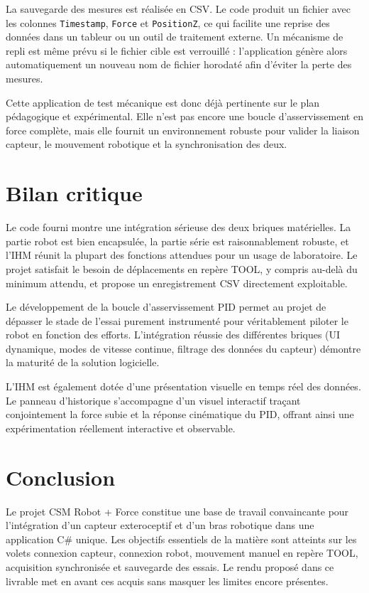 \documentclass[11pt,a4paper]{article}
\begin{document}
La sauvegarde des mesures est r\'ealis\'ee en CSV. Le code produit un fichier avec les colonnes \texttt{Timestamp}, \texttt{Force} et \texttt{PositionZ}, ce qui facilite une reprise des donn\'ees dans un tableur ou un outil de traitement externe. Un m\'ecanisme de repli est m\^eme pr\'evu si le fichier cible est verrouill\'e : l'application g\'en\`ere alors automatiquement un nouveau nom de fichier horodat\'e afin d'\'eviter la perte des mesures.

Cette application de test m\'ecanique est donc d\'ej\`a pertinente sur le plan p\'edagogique et exp\'erimental. Elle n'est pas encore une boucle d'asservissement en force compl\`ete, mais elle fournit un environnement robuste pour valider la liaison capteur, le mouvement robotique et la synchronisation des deux.

\section{Bilan critique}
Le code fourni montre une int\'egration s\'erieuse des deux briques mat\'erielles. La partie robot est bien encapsul\'ee, la partie s\'erie est raisonnablement robuste, et l'IHM r\'eunit la plupart des fonctions attendues pour un usage de laboratoire. Le projet satisfait le besoin de d\'eplacements en rep\`ere TOOL, y compris au-del\`a du minimum attendu, et propose un enregistrement CSV directement exploitable.

Le d\'eveloppement de la boucle d'asservissement PID permet au projet de d\'epasser le stade de l'essai purement instrument\'e pour v\'eritablement piloter le robot en fonction des efforts. L'int\'egration r\'eussie des diff\'erentes briques (UI dynamique, modes de vitesse continue, filtrage des donn\'ees du capteur) d\'emontre la maturit\'e de la solution logicielle.

L'IHM est \'egalement dot\'ee d'une pr\'esentation visuelle en temps r\'eel des donn\'ees. Le panneau d'historique s'accompagne d'un visuel interactif tra\c{c}ant conjointement la force subie et la r\'eponse cin\'ematique du PID, offrant ainsi une exp\'erimentation r\'eellement interactive et observable.

\section{Conclusion}
Le projet CSM Robot + Force constitue une base de travail convaincante pour l'int\'egration d'un capteur exteroceptif et d'un bras robotique dans une application C\# unique. Les objectifs essentiels de la mati\`ere sont atteints sur les volets connexion capteur, connexion robot, mouvement manuel en rep\`ere TOOL, acquisition synchronis\'ee et sauvegarde des essais. Le rendu propos\'e dans ce livrable met en avant ces acquis sans masquer les limites encore pr\'esentes.
\end{document}
